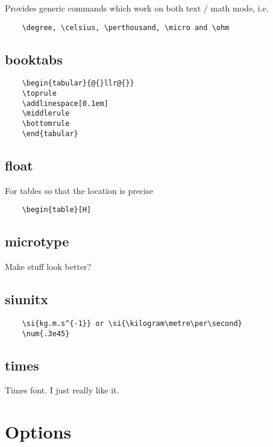 \documentclass{article}
\begin{document}
Provides generic commands which work on both text / math mode, i.e.

\begin{verbatim}
	\degree, \celsius, \perthousand, \micro and \ohm
\end{verbatim}

\subsection{booktabs}

\begin{verbatim}
	\begin{tabular}{@{}llr@{}}
	\toprule
	\addlinespace[0.1em]
	\middlerule
	\bottomrule
	\end{tabular}
\end{verbatim}

\subsection{float}

For tables so that the location is precise
	
\begin{verbatim}
	\begin{table}[H]
\end{verbatim}


\subsection{microtype}

Make stuff look better?

\subsection{siunitx}

\begin{verbatim}
	\si{kg.m.s^{-1}} or \si{\kilogram\metre\per\second}
	\num{.3e45} 
\end{verbatim}

\subsection{times}

Times font. I just really like it.

\section{Options}
\end{document}
